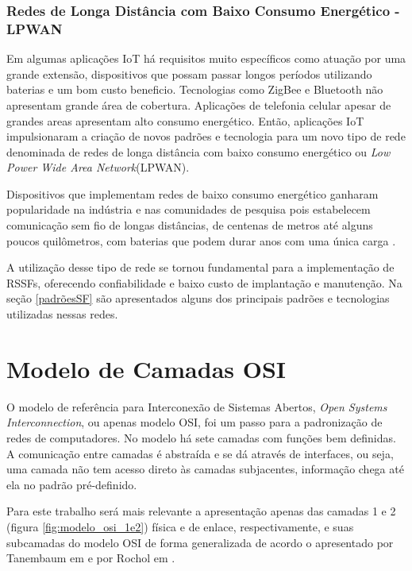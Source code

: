 \subsubsection*{Redes de Longa Distância com Baixo Consumo Energético - LPWAN}
Em algumas aplicações IoT há requisitos muito específicos como atuação por uma grande extensão, dispositivos que possam passar longos períodos utilizando baterias e um bom custo beneficio. Tecnologias como ZigBee e Bluetooth não apresentam grande área de cobertura. Aplicações de telefonia celular apesar de grandes areas apresentam alto consumo energético.  Então, aplicações IoT impulsionaram a criação de novos padrões e tecnologia para um novo tipo de rede denominada de redes de longa distância com baixo consumo energético ou \emph{Low Power Wide Area Network}(LPWAN).

Dispositivos que implementam redes de baixo consumo energético ganharam popularidade na indústria e nas comunidades de pesquisa pois estabelecem comunicação sem fio de longas distâncias, de centenas de metros até alguns poucos quilômetros, com baterias que podem durar anos com uma única carga \cite{mekki2019comparative}.

A utilização desse tipo de rede se tornou fundamental para a implementação de RSSFs, oferecendo confiabilidade e baixo custo de implantação e manutenção. Na seção \ref{padrõesSF} são apresentados alguns dos principais padrões e tecnologias utilizadas nessas redes.

\section{Modelo de Camadas OSI}
\label{osi}
O modelo de referência para Interconexão de Sistemas Abertos, \emph{Open Systems Interconnection}, ou apenas modelo OSI, foi um passo para a padronização de redes de computadores. No modelo há sete camadas com funções bem definidas. A comunicação entre camadas é abstraída e se dá através de interfaces, ou seja, uma camada não tem acesso direto às camadas subjacentes, informação chega até ela no padrão pré-definido.

Para este trabalho será mais relevante a apresentação apenas das camadas 1 e 2 (figura \ref{fig:modelo_osi_1e2})  física e de enlace, respectivamente, e suas subcamadas do modelo OSI de forma generalizada de acordo o apresentado por Tanembaum em \cite{tanembaum2011} e por Rochol em \cite{rochol2018sistemas}.

